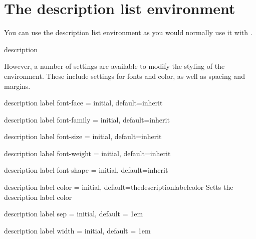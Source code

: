 \section{The description list environment}

You can use the description list environment as you would normally use it with \latexe.

\begin{docEnv} {description} {}
\end{docEnv}

However, a number of settings are available to modify the styling of the environment. These 
include settings for fonts and color, as well as spacing and margins.

\begin{docKey} {description label font-face} { =  } {initial, default=inherit}
\end{docKey}

\begin{docKey} {description label font-family} { =  } {initial, default=inherit}
\end{docKey}

\begin{docKey} {description label font-size} { =  } {initial, default=inherit}
\end{docKey}

\begin{docKey} {description label font-weight} { =  } {initial, default=inherit}
\end{docKey}

\begin{docKey} {description label font-shape} { =  } {initial, default=inherit}
\end{docKey}

\begin{docKey} {description label color} { =  } {initial, default=thedescriptionlabelcolor}
  Setts the description label color
\end{docKey}

\begin{docKey} {description label sep} { =  } {initial, default = 1em}
\end{docKey}

\begin{docKey} {description label width} { =  } {initial, default = 1em}
\end{docKey}

